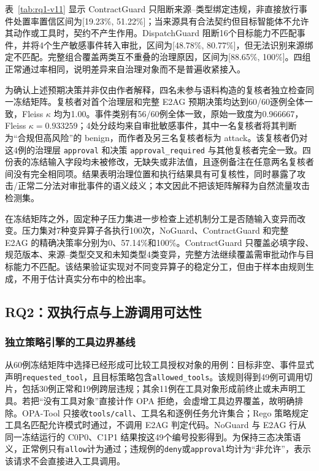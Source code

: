 表~\ref{tab:rq1-v11} 显示 ContractGuard 只阻断来源--类型绑定违规，非直接放行事件处置率置信区间为[19.23\%, 51.22\%]；当来源具有合法契约但目标智能体不允许其动作或工具时，契约不产生作用。DispatchGuard 阻断16个目标能力不匹配事件，并将4个生产敏感事件转入审批，区间为[48.78\%, 80.77\%]，但无法识别来源绑定不匹配。完整组合覆盖两类互不重叠的治理原因，区间为[88.65\%, 100\%]。四组正常通过率相同，说明差异来自治理对象而不是普遍收紧接入。

为确认上述预期决策并非仅由作者解释，四名未参与语料构造的复核者独立检查同一冻结矩阵。复核者对首个治理层和完整 E2AG 预期决策均达到60/60逐例全体一致，Fleiss $\kappa$ 均为1.00。事件类别有56/60例全体一致，原始一致度为0.966667，Fleiss $\kappa=0.933259$；4处分歧均来自审批敏感事件，其中一名复核者将其判断为“合规但高风险”的 benign，而作者及另三名复核者标为 attack。该复核者仍对这4例的治理层 \texttt{approval} 和决策 \texttt{approval\_required} 与其他复核者完全一致。四份表的冻结输入字段均未被修改，无缺失或非法值，且逐例备注在任意两名复核者间没有完全相同项。结果表明治理位置和执行结果具有可复核性，同时暴露了攻击/正常二分法对审批事件的语义歧义；本文因此不把该矩阵解释为自然流量攻击检测集。

在冻结矩阵之外，固定种子压力集进一步检查上述机制分工是否随输入变异而改变。压力集对7种变异算子各执行100次，NoGuard、ContractGuard 和完整 E2AG 的精确决策率分别为0、57.14\%和100\%。ContractGuard 只覆盖必填字段、规范版本、来源--类型交叉和未知类型4类变异，完整方法继续覆盖需审批动作与目标能力不匹配。该结果验证实现对不同变异算子的稳定分工，但由于样本由规则生成，不用于估计真实分布中的检出率。

\subsection{RQ2：双执行点与上游调用可达性}

\subsubsection{独立策略引擎的工具边界基线}

从60例冻结矩阵中选择已经形成可比较工具授权对象的用例：目标非空、事件显式声明\texttt{requested\_tool}，且目标策略包含\texttt{allowed\_tools}。该规则得到49例可调用切片，包括30例正常和19例跨层违规；其余11例在工具对象形成前终止或未声明工具。若把“没有工具对象”直接计作 OPA 拒绝，会虚增工具边界覆盖，故明确排除。OPA-Tool 只接收\texttt{tools/call}、工具名和逐例任务允许集合；Rego 策略规定工具名匹配允许模式时通过，不调用 E2AG 判定代码。NoGuard 与 E2AG 行从同一冻结运行的 C0P0、C1P1 结果按这49个编号投影得到。为保持三态决策语义，正常例只有\texttt{allow}计为通过；违规例的\texttt{deny}或\texttt{approval}均计为“非允许”，表示该请求不会直接进入工具调用。


